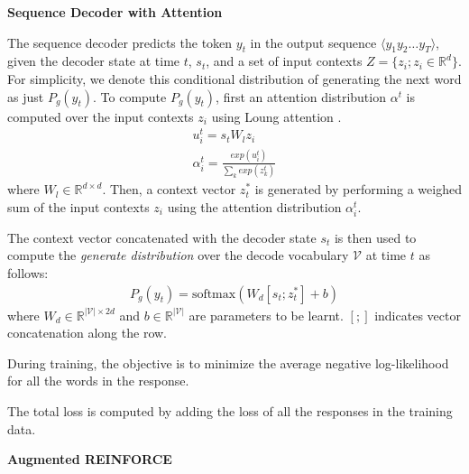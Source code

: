 \noindent\textbf{Sequence Decoder with Attention}
\label{ssec:rnndecoder}

The sequence decoder predicts the token $y_t$ in the output sequence $\langle y_1 y_2 \ldots y_T \rangle$, given the decoder state at time $t$, $s_t$, and a set of input contexts $Z=\{z_i ; z_i \in \mathbb{R}^{d}\}$. For simplicity, we denote this conditional distribution of generating the next word as just $P_g(y_t)$. To compute $P_g(y_t)$, first an attention distribution $\alpha^t$ is computed over the input contexts $z_i$ using Loung attention \cite{luong2015effective}. 
\begin{gather}
u_i^t = s_t W_l z_i \\
\alpha_i^t = \frac{exp(u_i^t)}{\sum\nolimits_{k}exp(z_k^t)} \label{eq:memattn}
\end{gather}
where $W_l \in \mathbb{R}^{d \times d}$. Then, a context vector $z^*_t$ is generated by performing a weighed sum of the input contexts $z_i$ using the attention distribution $\alpha^t_i$.

The context vector concatenated with the decoder state $s_t$ is then used to compute the \textit{generate distribution} over the decode vocabulary $\mathcal{V}$ at time $t$ as follows:
\begin{gather}
P_{g}(y_t)= \text{softmax}( W_d [s_t;z^*_t] + b )
\end{gather}
where $W_d \in \mathbb{R}^{|\mathcal{V}| \times 2d}$ and $b \in \mathbb{R}^{|\mathcal{V}|}$ are parameters to be learnt. $[;]$ indicates vector concatenation along the row.

During training, the objective is to minimize the average negative log-likelihood for all the words in the response.

The total loss is computed by adding the loss of all the responses in the training data.

\noindent\textbf{Augmented REINFORCE}
\label{ssec:Areinforce}

